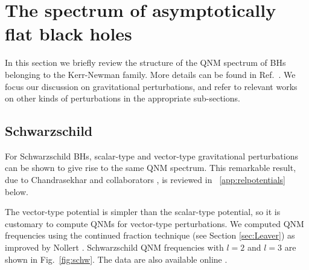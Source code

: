 \documentclass[]{iopart}
\begin{document}
\section{\label{sec:asflat}The spectrum of asymptotically flat black holes}

In this section we briefly review the structure of the QNM spectrum of BHs
belonging to the Kerr-Newman family. More details can be found in
Ref.~\cite{Berti:2004md}.  We focus our discussion on gravitational
perturbations, and refer to relevant works on other kinds of perturbations in
the appropriate sub-sections.

\subsection{\label{sec:qnmschw}Schwarzschild}

For Schwarzschild BHs, scalar-type and vector-type gravitational perturbations
can be shown to give rise to the same QNM spectrum. This remarkable result,
due to Chandrasekhar and collaborators
\cite{MTB,Chandrasekhar:1975qn,chandrarelation}, is reviewed in
~\ref{app:relpotentials} below.

The vector-type potential is simpler than the scalar-type potential, so it is
customary to compute QNMs for vector-type perturbations. We computed QNM
frequencies using the continued fraction technique (see Section
\ref{sec:Leaver}) as improved by Nollert \cite{Nollertlargen}. Schwarzschild
QNM frequencies with $l=2$ and $l=3$ are shown in Fig.~\ref{fig:schw}. The
data are also available online \cite{rdweb}.
\end{document}
